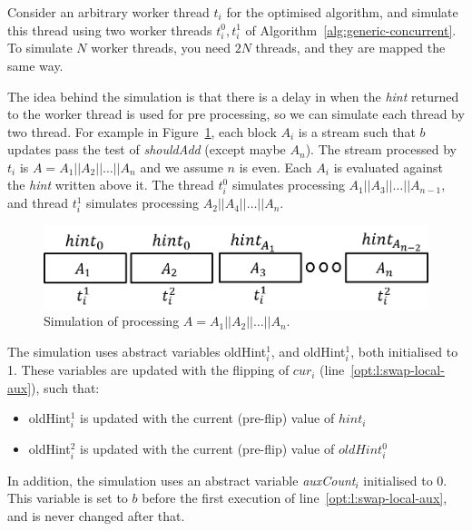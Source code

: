 Consider an arbitrary worker thread $t_i$ for the optimised algorithm,
and simulate this thread using two worker threads $t_i^0,t_i^1$ of Algorithm~\ref{alg:generic-concurrent}.
To simulate $N$ worker threads, you need $2N$ threads, and they are mapped the same way.

The idea behind the simulation is that there is a delay in when the \emph{hint} returned to the worker thread
is used for pre processing, so we can simulate each thread by two thread. For example in Figure~\ref{fig:optimisedSimulation},
each block $A_i$ is a stream such that $b$ updates pass the test of \emph{shouldAdd} (except maybe $A_n$).
The stream processed by $t_i$ is $A=A_1||A_2||\dots||A_n$ and we assume $n$ is even.
Each $A_i$ is evaluated against the \emph{hint} written above it. The thread $t_i^0$ simulates processing
$A_1||A_3||\dots ||A_{n-1}$, and thread $t_i^1$ simulates processing $A_2||A_4||\dots||A_n$.

\begin{figure}[H]
    \centering
    \includegraphics[width=5in]{images/optimisedSimulation.png}
    \caption{Simulation of processing $A=A_1||A_2||\dots||A_n$.}
    \label{fig:optimisedSimulation}
\end{figure}

The simulation uses abstract variables oldHint$_i^1$, and oldHint$_i^1$, both initialised to 1.
These variables are updated with the flipping of $cur_i$ (line~\ref{opt:l:swap-local-aux}), such that:
\begin{itemize}
    \item oldHint$_i^1$ is updated with the current (pre-flip) value of $hint_i$
    \item oldHint$_i^2$ is updated with the current (pre-flip) value of $oldHint_i^0$
\end{itemize}


In addition, the simulation uses an abstract variable \emph{auxCount$_i$} initialised to 0. This variable is set to
$b$ before the first execution of line~\ref{opt:l:swap-local-aux}, and is never changed after that. 

